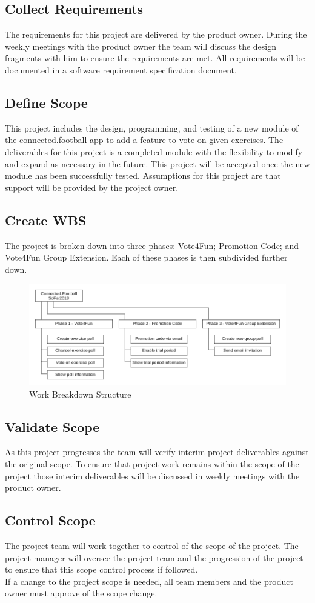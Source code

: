 \subsection{Collect Requirements}
The requirements for this project are delivered by the product owner. During the weekly meetings with the product owner the team will discuss the design fragments with him to ensure the requirements are met. All requirements will be documented in a software requirement specification document.
\subsection{Define Scope}
This project includes the design, programming, and testing of a new module of the connected.football app to add a feature to vote on given exercises. The deliverables for this project is a completed module with the flexibility to modify and expand as necessary in the future. This project will be accepted once the new module has been successfully tested. Assumptions for this project are that support will be provided by the project owner.
\subsection{Create WBS}

The project is broken down into three phases: Vote4Fun; Promotion Code; and Vote4Fun Group Extension. Each of these phases is then subdivided further down.
\begin{figure}[!ht]
	\includegraphics[width=\textwidth]{content/diagram/scope/wbs.png}
	\caption{Work Breakdown Structure}
\end{figure}
\subsection{Validate Scope}
As this project progresses the team will verify interim project deliverables against the original scope. To ensure that project work remains within the scope of the project those interim deliverables will be discussed in weekly meetings with the product owner.
\subsection{Control Scope}
The project team will work together to control of the scope of the project. The project manager will oversee the project team and the progression of the project to ensure that this scope control process if followed.\\
If a change to the project scope is needed, all team members and the product owner must approve of the scope change.